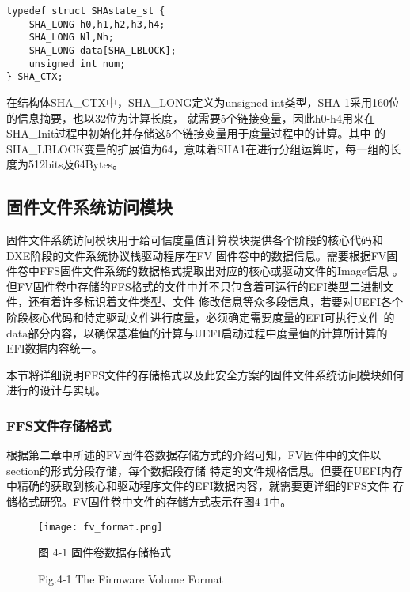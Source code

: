 \begin{lstlisting}
typedef struct SHAstate_st {
    SHA_LONG h0,h1,h2,h3,h4;
    SHA_LONG Nl,Nh;
    SHA_LONG data[SHA_LBLOCK];
    unsigned int num;
} SHA_CTX;
\end{lstlisting}

在结构体SHA\_CTX中，SHA\_LONG定义为unsigned int类型，SHA-1采用160位的信息摘要，也以32位为计算长度，
就需要5个链接变量，因此h0-h4用来在SHA\_Init过程中初始化并存储这5个链接变量用于度量过程中的计算。其中
的SHA\_LBLOCK变量的扩展值为64，意味着SHA1在进行分组运算时，每一组的长度为512bits及64Bytes。

\subsection{固件文件系统访问模块}
固件文件系统访问模块用于给可信度量值计算模块提供各个阶段的核心代码和DXE阶段的文件系统协议栈驱动程序在FV
固件卷中的数据信息。需要根据FV固件卷中FFS固件文件系统的数据格式提取出对应的核心或驱动文件的Image信息
\cite{english2}。
但FV固件卷中存储的FFS格式的文件中并不只包含着可运行的EFI类型二进制文件，还有着许多标识着文件类型、文件
修改信息等众多段信息，若要对UEFI各个阶段核心代码和特定驱动文件进行度量，必须确定需要度量的EFI可执行文件
的data部分内容，以确保基准值的计算与UEFI启动过程中度量值的计算所计算的EFI数据内容统一。
\par 本节将详细说明FFS文件的存储格式以及此安全方案的固件文件系统访问模块如何进行的设计与实现。

\subsubsection{FFS文件存储格式}
根据第二章中所述的FV固件卷数据存储方式的介绍可知，FV固件中的文件以section的形式分段存储，每个数据段存储
特定的文件规格信息。但要在UEFI内存中精确的获取到核心和驱动程序文件的EFI数据内容，就需要更详细的FFS文件
存储格式研究。FV固件卷中文件的存储方式表示在图4-1中。

\begin{figure}[htb]
    \vspace{0cm}   
    \setlength{\abovecaptionskip}{0.3cm}
	\centering
    \texttt{[image: fv\_format.png]}
    \caption*{图 4-1 固件卷数据存储格式}
    \setlength{\belowcaptionskip}{-0.7cm}
    \caption*{Fig.4-1 The Firmware Volume Format}
\end{figure}

